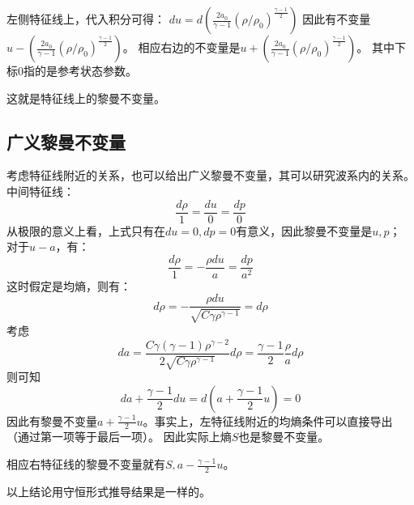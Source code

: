 \documentclass[UTF8,zihao=5]{ctexart} %
\newcommand*{\pd}[2]{\frac{\partial #1}{\partial #2}}
\begin{document}
左侧特征线上，代入积分可得：
$du=d\left(\frac{2a_0}{\gamma-1}(\rho/\rho_0)^\frac{\gamma-1}{2}\right)$
因此有不变量$u-\left(\frac{2a_0}{\gamma-1}(\rho/\rho_0)^\frac{\gamma-1}{2}\right)$。
相应右边的不变量是$u+\left(\frac{2a_0}{\gamma-1}(\rho/\rho_0)^\frac{\gamma-1}{2}\right)$。
其中下标0指的是参考状态参数。

这就是特征线上的黎曼不变量。

\subsection{广义黎曼不变量}

考虑特征线附近的关系，也可以给出广义黎曼不变量，其可以研究波系内的关系。
中间特征线：
$$
\frac{d\rho}{1}=\frac{du}{0}=\frac{dp}{0}
$$
从极限的意义上看，上式只有在$du=0,dp=0$有意义，因此黎曼不变量是$u,p$；
对于$u-a$，有：
$$
\frac{d\rho}{1}=-\frac{\rho du}{a}=\frac{dp}{a^2}
$$
这时假定是均熵，则有：
$$
d\rho=-\frac{\rho du}{\sqrt{C\gamma\rho^{\gamma-1}}}=d\rho
$$
考虑
$$
da=\frac{C\gamma(\gamma-1)\rho^{\gamma-2}}{2\sqrt{C\gamma\rho^{\gamma-1}}}d\rho
=\frac{\gamma-1}{2}\frac{\rho}{a}d\rho
$$
则可知
$$
da+\frac{\gamma-1}{2}du=d(a+\frac{\gamma-1}{2}u)=0
$$
因此有黎曼不变量$a+\frac{\gamma-1}{2}u$。事实上，左特征线附近的均熵条件可以直接导出（通过第一项等于最后一项）。
因此实际上熵$S$也是黎曼不变量。

相应右特征线的黎曼不变量就有$S,a-\frac{\gamma-1}{2}u$。

以上结论用守恒形式推导结果是一样的。






\end{document}

